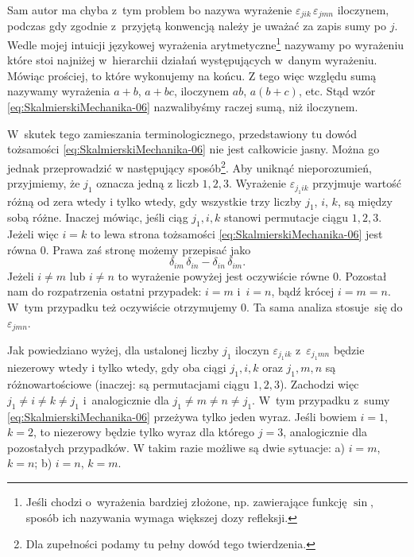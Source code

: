 \documentclass[a4paper,11pt]{article}
\begin{document}
Sam autor ma chyba z~tym problem bo nazywa wyrażenie
$\varepsilon_{ j i k } \, \varepsilon_{ j m n }$ iloczynem, podczas gdy zgodnie z~przyjętą
konwencją należy je uważać za zapis sumy po $j$. Wedle mojej intuicji
językowej wyrażenia arytmetyczne\footnote{Jeśli chodzi o~wyrażenia bardziej
  złożone, np. zawierające funkcję $\sin$, sposób ich nazywania wymaga
  większej dozy refleksji.} nazywamy po wyrażeniu które stoi najniżej
w~hierarchii działań występujących w~danym wyrażeniu. Mówiąc prościej,
to które wykonujemy na końcu. Z tego więc względu sumą nazywamy wyrażenia
$a + b$, $a + bc$, iloczynem $ab$, $a ( b + c )$, etc. Stąd wzór
\eqref{eq:SkalmierskiMechanika-06} nazwalibyśmy raczej sumą, niż iloczynem.

W~skutek tego zamieszania terminologicznego, przedstawiony tu dowód
tożsamości \eqref{eq:SkalmierskiMechanika-06} nie jest całkowicie jasny.
Można go jednak przeprowadzić w następujący sposób\footnote{Dla zupełności
  podamy tu pełny dowód tego twierdzenia.}. Aby uniknąć nieporozumień,
przyjmiemy, że $j_{ 1 }$ oznacza jedną z liczb $1, 2, 3$. Wyrażenie
$\varepsilon_{ j_{ 1 } i k }$ przyjmuje wartość różną od zera wtedy i tylko wtedy, gdy
wszystkie trzy liczby $j_{ 1 }$, $i$, $k$, są między sobą różne. Inaczej
mówiąc, jeśli ciąg $j_{ 1 }, i, k$ stanowi permutacje ciągu $1, 2, 3$.
Jeżeli więc $i = k$ to lewa strona tożsamości
\eqref{eq:SkalmierskiMechanika-06} jest równa 0.
Prawa zaś stronę możemy przepisać jako
\begin{equation}
  \label{eq:SkalmierskiMechanika-07}
  \delta_{ i m } \, \delta_{ i n } - \delta_{ i n } \, \delta_{ i m }.
\end{equation}
Jeżeli $i \neq m$ lub $i \neq n$ to wyrażenie powyżej jest oczywiście równe 0.
Pozostał nam do rozpatrzenia ostatni przypadek: $i = m$ i~$i = n$, bądź
krócej $i = m = n$. W~tym przypadku też oczywiście otrzymujemy 0. Ta sama
analiza stosuje~się do $\varepsilon_{ j m n }$.

Jak powiedziano wyżej, dla ustalonej liczby $j_{ 1 }$ iloczyn
$\varepsilon_{ j_{ 1 } i k }$ z~$\varepsilon_{ j_{ 1 } m n }$ będzie niezerowy wtedy i tylko wtedy,
gdy oba ciągi $j_{ 1 }, i, k$ oraz $j_{ 1 }, m, n$ są różnowartościowe
(inaczej: są permutacjami ciągu $1, 2, 3$). Zachodzi więc
$j_{ 1 } \neq i \neq k \neq j_{ 1 }$ i~analogicznie dla $j_{ 1 } \neq m \neq n \neq j_{ 1 }$.
W~tym przypadku z~sumy \eqref{eq:SkalmierskiMechanika-06} przeżywa tylko
jeden wyraz. Jeśli bowiem $i = 1$, $k = 2$, to niezerowy będzie tylko wyraz
dla którego $j = 3$, analogicznie dla pozostałych przypadków. W takim razie
możliwe są dwie sytuacje: a) $i = m$, $k = n$; b) $i = n$, $k = m$.
\end{document}
